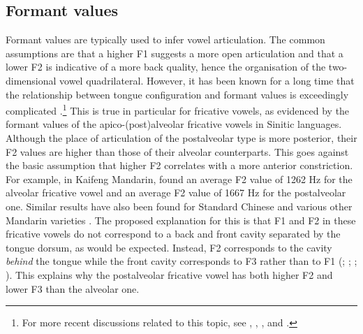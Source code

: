 \documentclass[output=paper,colorlinks,citecolor=brown,chinesefont]{langscibook}
\begin{document}
\subsection{Formant values}
Formant values are typically used to infer vowel articulation. The common assumptions are that a higher F1 suggests a more open articulation and that a lower F2 is indicative of a more back quality, hence the organisation of the two-dimensional vowel quadrilateral. However, it has been known for a long time that the relationship between tongue configuration and formant values is exceedingly complicated \citep{Delattre_1951}.\footnote{For more recent discussions related to this topic, see \citet[52--55]{Faytak_2018}, \citet[22--44]{Esling_et_al_2019}, \citet[217--218]{westerberg_2020}, and \citet{Makeeva_and_Kuznetsova_2022}.} This is true in particular for fricative vowels, as evidenced by the formant values of the apico-(post)alveolar fricative vowels in Sinitic languages. Although the place of articulation of the postalveolar type is more posterior, their F2 values are higher than those of their alveolar counterparts. This goes against the basic assumption that higher F2 correlates with a more anterior constriction. For example, in Kaifeng Mandarin, \citet{Wang_2020} found an average F2 value of 1262 Hz for the alveolar fricative vowel and an average F2 value of 1667 Hz for the postalveolar one. Similar results have also been found for Standard Chinese \citep{Lee-Kim_2014} and various other Mandarin varieties \citep{Huang&al_2021}. The proposed explanation for this is that F1 and F2 in these fricative vowels do not correspond to a back and front cavity separated by the tongue dorsum, as would be expected. Instead, F2 corresponds to the cavity \textit{behind} the tongue while the front cavity corresponds to F3 rather than to F1 (\cite{Ling_2007}; \cite{Ling_2009}; \cite{Wang&al_2013}; \cite{Lee-Kim_2014}). This explains why the postalveolar fricative vowel has both higher F2 and lower F3 than the alveolar one.
\end{document}
